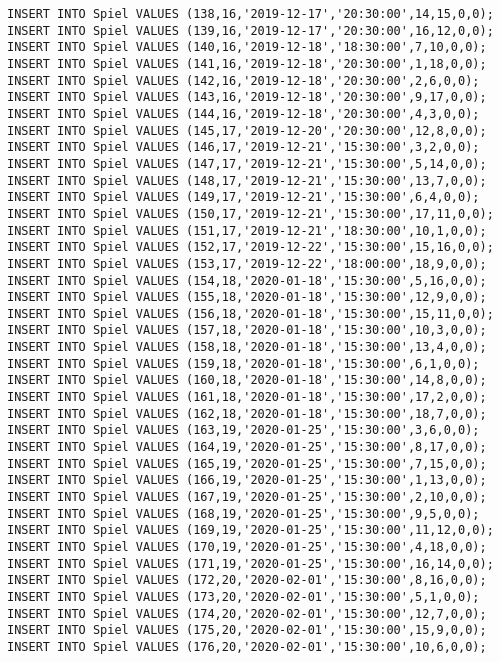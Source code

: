 \documentclass{lehramt-informatik-aufgabe}
\begin{document}
\begin{verbatim}
INSERT INTO Spiel VALUES (138,16,'2019-12-17','20:30:00',14,15,0,0);
INSERT INTO Spiel VALUES (139,16,'2019-12-17','20:30:00',16,12,0,0);
INSERT INTO Spiel VALUES (140,16,'2019-12-18','18:30:00',7,10,0,0);
INSERT INTO Spiel VALUES (141,16,'2019-12-18','20:30:00',1,18,0,0);
INSERT INTO Spiel VALUES (142,16,'2019-12-18','20:30:00',2,6,0,0);
INSERT INTO Spiel VALUES (143,16,'2019-12-18','20:30:00',9,17,0,0);
INSERT INTO Spiel VALUES (144,16,'2019-12-18','20:30:00',4,3,0,0);
INSERT INTO Spiel VALUES (145,17,'2019-12-20','20:30:00',12,8,0,0);
INSERT INTO Spiel VALUES (146,17,'2019-12-21','15:30:00',3,2,0,0);
INSERT INTO Spiel VALUES (147,17,'2019-12-21','15:30:00',5,14,0,0);
INSERT INTO Spiel VALUES (148,17,'2019-12-21','15:30:00',13,7,0,0);
INSERT INTO Spiel VALUES (149,17,'2019-12-21','15:30:00',6,4,0,0);
INSERT INTO Spiel VALUES (150,17,'2019-12-21','15:30:00',17,11,0,0);
INSERT INTO Spiel VALUES (151,17,'2019-12-21','18:30:00',10,1,0,0);
INSERT INTO Spiel VALUES (152,17,'2019-12-22','15:30:00',15,16,0,0);
INSERT INTO Spiel VALUES (153,17,'2019-12-22','18:00:00',18,9,0,0);
INSERT INTO Spiel VALUES (154,18,'2020-01-18','15:30:00',5,16,0,0);
INSERT INTO Spiel VALUES (155,18,'2020-01-18','15:30:00',12,9,0,0);
INSERT INTO Spiel VALUES (156,18,'2020-01-18','15:30:00',15,11,0,0);
INSERT INTO Spiel VALUES (157,18,'2020-01-18','15:30:00',10,3,0,0);
INSERT INTO Spiel VALUES (158,18,'2020-01-18','15:30:00',13,4,0,0);
INSERT INTO Spiel VALUES (159,18,'2020-01-18','15:30:00',6,1,0,0);
INSERT INTO Spiel VALUES (160,18,'2020-01-18','15:30:00',14,8,0,0);
INSERT INTO Spiel VALUES (161,18,'2020-01-18','15:30:00',17,2,0,0);
INSERT INTO Spiel VALUES (162,18,'2020-01-18','15:30:00',18,7,0,0);
INSERT INTO Spiel VALUES (163,19,'2020-01-25','15:30:00',3,6,0,0);
INSERT INTO Spiel VALUES (164,19,'2020-01-25','15:30:00',8,17,0,0);
INSERT INTO Spiel VALUES (165,19,'2020-01-25','15:30:00',7,15,0,0);
INSERT INTO Spiel VALUES (166,19,'2020-01-25','15:30:00',1,13,0,0);
INSERT INTO Spiel VALUES (167,19,'2020-01-25','15:30:00',2,10,0,0);
INSERT INTO Spiel VALUES (168,19,'2020-01-25','15:30:00',9,5,0,0);
INSERT INTO Spiel VALUES (169,19,'2020-01-25','15:30:00',11,12,0,0);
INSERT INTO Spiel VALUES (170,19,'2020-01-25','15:30:00',4,18,0,0);
INSERT INTO Spiel VALUES (171,19,'2020-01-25','15:30:00',16,14,0,0);
INSERT INTO Spiel VALUES (172,20,'2020-02-01','15:30:00',8,16,0,0);
INSERT INTO Spiel VALUES (173,20,'2020-02-01','15:30:00',5,1,0,0);
INSERT INTO Spiel VALUES (174,20,'2020-02-01','15:30:00',12,7,0,0);
INSERT INTO Spiel VALUES (175,20,'2020-02-01','15:30:00',15,9,0,0);
INSERT INTO Spiel VALUES (176,20,'2020-02-01','15:30:00',10,6,0,0);

\end{verbatim}
\end{document}
